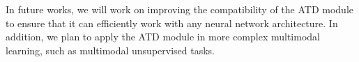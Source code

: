 \documentclass{ecai}
\begin{document}
In future works, we will work on improving the compatibility of the ATD module to ensure that it can efficiently work with any neural network architecture. In addition, we plan to apply the ATD module in more complex multimodal learning, such as multimodal unsupervised tasks.






\end{document}
